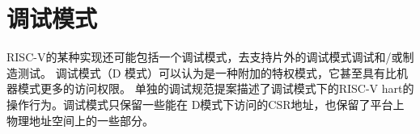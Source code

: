 \section{调试模式
  } 


RISC-V的某种实现还可能包括一个调试模式，去支持片外的调试模式调试和/或制造测试。 
调试模式（D 模式）可以认为是一种附加的特权模式，它甚至具有比机器模式更多的访问权限。
单独的调试规范提案描述了调试模式下的RISC-V hart的操作行为。调试模式只保留一些能在
D模式下访问的CSR地址，也保留了平台上物理地址空间上的一些部分。


